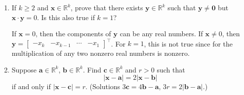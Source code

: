 \begin{enumerate}
\begin{align*}
    & = (\mathbf{x} - \mathbf{y}) (\mathbf{x} - \mathbf{y})\\
    & = \lvert\mathbf{x}\rvert^2 - 2\mathbf{x}\cdot\mathbf{y} +
      \lvert\mathbf{y}\rvert^2\eqnumtag\label{ch1prob17b}\\
    \intertext{Then by adding \cref{ch1prob17a,ch1prob17b}, we have}
    \lvert\mathbf{x} + \mathbf{y}\rvert^2 +
    \lvert\mathbf{x} - \mathbf{y}\rvert^2
    & = 2\lvert\mathbf{x}\rvert^2 + 2\lvert\mathbf{y}\rvert^2
  \end{align*}
  Then \(\mathbf{x} + \mathbf{y}\) is the longer diagonal of the parallelogram
  and \(\mathbf{x} - \mathbf{y}\) is the shorter diagonal of the parallelogram
  see \cref{ch1prob17}.
  \begin{figure}[H]
    \centering
    
    \caption{The parallelogram for vectors \(\mathbf{x}\) and \(\mathbf{y}\).}
    \label{ch1prob17}
  \end{figure}
  Then the sum of squares of the diagonals of a parallelogram are equal to the
  sum of the squares of the sides of the parallelogram.
\item
  If \(k\geq 2\) and \(\mathbf{x}\in\mathbb{R}^k\), prove that there exists
  \(\mathbf{y}\in\mathbb{R}^k\) such that \(\mathbf{y}\neq\mathbf{0}\) but
  \(\mathbf{x}\cdot\mathbf{y} = 0\).
  Is this also true if \(k = 1\)?
  \par\smallskip
  If \(\mathbf{x} = 0\), then the components of \(\mathbf{y}\) can be any real
  numbers.
  If \(\mathbf{x}\neq 0\), then
  \(\mathbf{y} =
  \begin{bmatrix} -x_k & -x_{k - 1} & \cdots & -x_1\end{bmatrix}^{\intercal}\).
  For \(k = 1\), this is not true since for the multiplication of any two
  nonzero real numbers is nonzero.
\item
  Suppose \(\mathbf{a}\in\mathbb{R}^k\), \(\mathbf{b}\in\mathbb{R}^k\).
  Find \(\mathbf{c}\in\mathbb{R}^k\) and \(r > 0\) such that
  \[
  \lvert\mathbf{x} - \mathbf{a}\rvert = 2\lvert\mathbf{x} - \mathbf{b}\rvert
  \]
  if and only if \(\lvert\mathbf{x} - \mathbf{c}\rvert = r\).
  (Solutions \(3\mathbf{c} = 4\mathbf{b} - \mathbf{a}\),
  \(3r = 2\lvert\mathbf{b} - \mathbf{a}\rvert\).)
\end{enumerate}
